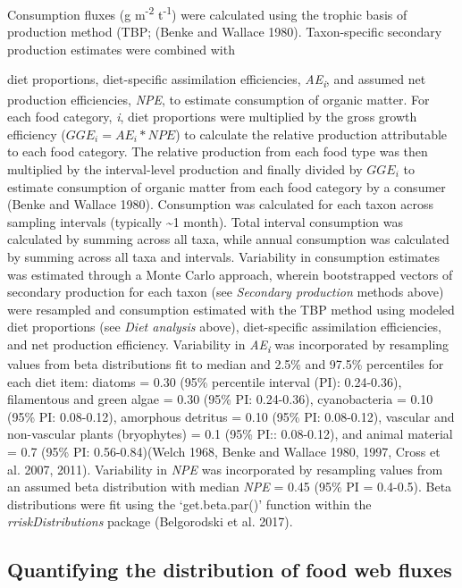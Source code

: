 \documentclass[
]{article}
\begin{document}
Consumption fluxes (g m\textsuperscript{-2} t\textsuperscript{-1}) were
calculated using the trophic basis of production method (TBP; (Benke and
Wallace 1980). Taxon-specific secondary production estimates were
combined with

diet proportions, diet-specific assimilation efficiencies,
\emph{AE\textsubscript{i}}, and assumed net production efficiencies,
\emph{NPE}, to estimate consumption of organic matter. For each food
category, \emph{i}, diet proportions were multiplied by the gross growth
efficiency (\(GGE_{i} = AE_{i} * NPE\)) to calculate the relative
production attributable to each food category. The relative production
from each food type was then multiplied by the interval-level production
and finally divided by \(GGE_{i}\) to estimate consumption of organic
matter from each food category by a consumer (Benke and Wallace 1980).
Consumption was calculated for each taxon across sampling intervals
(typically \textasciitilde1 month). Total interval consumption was
calculated by summing across all taxa, while annual consumption was
calculated by summing across all taxa and intervals. Variability in
consumption estimates was estimated through a Monte Carlo approach,
wherein bootstrapped vectors of secondary production for each taxon (see
\emph{Secondary production} methods above) were resampled and
consumption estimated with the TBP method using modeled diet proportions
(see \emph{Diet analysis} above), diet-specific assimilation
efficiencies, and net production efficiency. Variability in
\emph{AE\textsubscript{i}} was incorporated by resampling values from
beta distributions fit to median and 2.5\% and 97.5\% percentiles for
each diet item: diatoms = 0.30 (95\% percentile interval (PI):
0.24-0.36), filamentous and green algae = 0.30 (95\% PI: 0.24-0.36),
cyanobacteria = 0.10 (95\% PI: 0.08-0.12), amorphous detritus = 0.10
(95\% PI: 0.08-0.12), vascular and non-vascular plants (bryophytes) =
0.1 (95\% PI:: 0.08-0.12), and animal material = 0.7 (95\% PI:
0.56-0.84)(Welch 1968, Benke and Wallace 1980, 1997, Cross et al. 2007,
2011). Variability in \emph{NPE} was incorporated by resampling values
from an assumed beta distribution with median \emph{NPE} = 0.45 (95\% PI
= 0.4-0.5). Beta distributions were fit using the `get.beta.par()'
function within the \emph{rriskDistributions} package (Belgorodski et
al. 2017).

\hypertarget{quantifying-the-distribution-of-food-web-fluxes}{%
\subsection{Quantifying the distribution of food web
fluxes}\label{quantifying-the-distribution-of-food-web-fluxes}}
\end{document}
